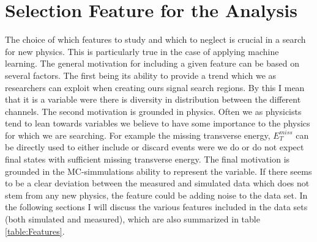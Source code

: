 \section{Selection Feature for the Analysis}
The choice of which features to study and which to neglect is crucial in a search for new physics. This is particularly true 
in the case of applying machine learning. The general motivation for including a given feature can be based on several factors. 
The first being its ability to provide a trend which we as researchers can exploit when creating ours signal search regions. By this I mean
that it is a variable were there is diversity in distribution between the different channels. The second motivation is grounded in 
physics. Often we as physicists tend to lean towards variables we believe to have some importance to the physics for which we are searching. For 
example the missing transverse energy, $E_T^{miss}$ can be directly used to either include or discard events were we do or do not expect final states
with sufficient missing transverse energy. The final motivation is grounded in the \ac{MC}-simmulations ability to represent the variable.
If there seems to be a clear deviation between the measured and simulated data which does not stem from any new physics, the feature could be 
adding noise to the data set. In the following sections I will discuss the various features included in the data sets (both simulated and measured),
which are also summarized in table \ref{table:Features}.